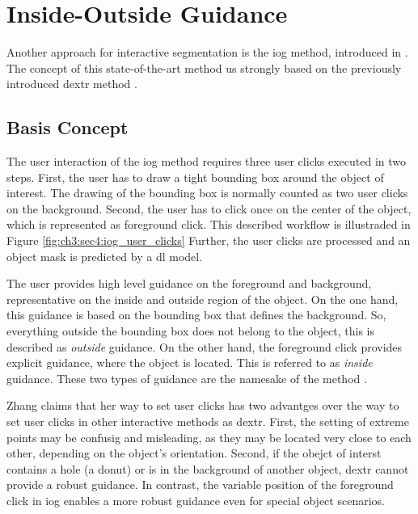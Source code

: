 
\section{Inside-Outside Guidance}\label{ord:ch3:sec4}

Another approach for interactive segmentation is the \gls{iog} method, introduced in \cite{Zha20-IOG}.
The concept of this state-of-the-art method us strongly based on the previously introduced \gls{dextr} method \cite{Man18-DEXTR}.

\subsection{Basis Concept}\label{ord:ch3:sec4:subsec1}
The user interaction of the \gls{iog} method requires three user clicks executed in two steps.
First, the user has to draw a tight bounding box around the object of interest. 
The drawing of the bounding box is normally counted as two user clicks on the background.
Second, the user has to click once on the center of the object, which is represented as foreground click. 
This described workflow is illustraded in Figure \ref{fig:ch3:sec4:iog_user_clicks}
Further, the user clicks are processed and an object mask is predicted by a \gls{dl} model.

The user provides high level guidance on the foreground and background, representative on the inside and outside region of the object.
On the one hand, this guidance is based on the bounding box that defines the background.
So, everything outside the bounding box does not belong to the object, this is described as \textit{outside} guidance.
On the other hand, the foreground click provides explicit guidance, where the object is located.
This is referred to as \textit{inside} guidance.
These two types of guidance are the namesake of the method .

Zhang claims that her way to set user clicks has two advantges over the way to set user clicks in other interactive methods as \gls{dextr}.
First, the setting of extreme points may be confusig and misleading, as they may be located very close to each other, depending on the object's orientation.
Second, if the obejct of interst contains a hole (\ie a donut) or is in the background of another object, \gls{dextr} cannot provide a robust guidance.
In contrast, the variable position of the foreground click in \gls{iog} enables a more robust guidance even for special object scenarios.

